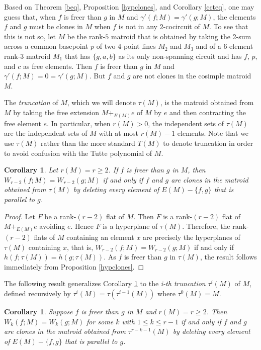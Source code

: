 \documentclass[12pt,reqno]{amsart}
\newtheorem{corollary}[theorem]{Corollary}
\theoremstyle{definition}
\theoremstyle{remark}
\numberwithin{equation}{section}
\begin{document}
Based on Theorem \ref{beq}, Proposition \ref{hypclones}, and Corollary \ref{ccteq}, one may guess that, when $f$ is freer than $g$ in $M$ and $\gamma'(f;M) = \gamma'(g;M)$, the elements $f$ and $g$ must be clones in $M$ when $f$ is not in any $2$-cocircuit of $M$. 
To see that this is not so, let $M$ be the rank-$5$ matroid that is obtained by taking the 2-sum across a common basepoint $p$ of two 4-point lines $M_2$ and $M_3$ and of a 6-element rank-$3$ matroid $M_1$ that has $\{g,a,b\}$ as its only non-spanning circuit and has $f$, $p$, and $c$ as free elements. 
Then $f$ is freer than $g$ in $M$ and $\gamma'(f;M)=0=\gamma'(g;M)$. But $f$ and $g$ are not clones in the cosimple matroid $M$.


The \textit{truncation} of $M$, which we will denote $\tau(M)$, is the matroid obtained from $M$ by taking the free extension $M+_{E(M)}e$ of $M$ by $e$ and then contracting the free element $e$. In particular, when $r(M)>0$, the independent sets of $\tau(M)$ are the independent sets of $M$ with at most $r(M)-1$ elements. Note that we use $\tau(M)$ rather than the more standard $T(M)$ to denote truncation in order to avoid confusion with the Tutte polynomial of $M$. 

\begin{corollary}\label{trunc}
    Let $r(M)=r\geq 2$. If $f$ is freer than $g$ in $M$, then $W_{r-2}(f;M)=W_{r-2}(g;M)$ if and only if $f$ and $g$ are clones in the matroid obtained from $\tau(M)$ by deleting every element of $E(M)-\{f,g\}$ that is parallel to $g$.  
\end{corollary}
    \begin{proof}
        Let $F$ be a rank-$(r-2)$ flat of $M$. 
        Then $F$ is a rank-$(r-2)$ flat of $M+_{E(M)}e$ avoiding $e$.
        Hence $F$ is a hyperplane of $\tau(M)$.
        Therefore, the rank-$(r-2)$ flats of $M$ containing an element $x$ are precisely the hyperplanes of $\tau(M)$ containing $x$, that is, $W_{r-2}(f;M)=W_{r-2}(g;M)$ if and only if $h(f;\tau(M))=h(g;\tau(M))$. 
        As $f$ is freer than $g$ in $\tau(M)$, the result follows immediately from Proposition \ref{hypclones}. 
    \end{proof}

    The following result generalizes Corollary \ref{trunc} to the \textit{i-th truncation} $\tau^i(M)$ of $M$, defined recursively by \mbox{$\tau^i(M)=\tau(\tau^{i-1}(M))$} where $\tau^0(M)=M$.     

    \begin{corollary}
        Suppose $f$ is freer than $g$ in $M$ and $r(M)=r\geq 2$. Then $W_{k}(f;M)=W_k(g;M)$ for some $k$ with $1\leq k\leq r-1$ if and only if $f$ and $g$ are clones in the matroid obtained from $\tau^{r-k-1}(M)$ by deleting every element of $E(M)-\{f,g\}$ that is parallel to $g$.
    \end{corollary}
\end{document}
